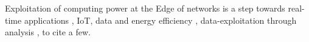 \documentclass[11pt]{sdm}
\begin{document}



Exploitation of computing power at the Edge of networks is a step towards real-time applications \cite{rausch_towards_2021,lin_cloudfog_2017}, \gls{IoT}, data and energy efficiency \cite{ieee_standards_association_smart_2018}, data-exploitation through analysis \cite{openfog_consortium_real-time_2018}, to cite a few.
\end{document}
